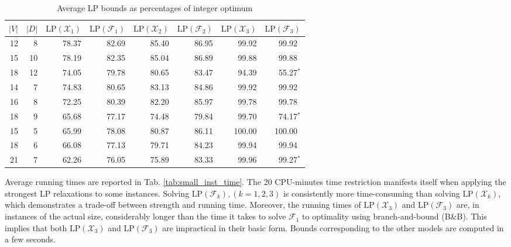 \begin{table}[h!]
\centering
\setlength{\tabcolsep}{6pt} %
\renewcommand{\arraystretch}{1.4} %
\begin{tabular}{rrrrrrrr}
$|V|$ & $|D|$ & $\text{LP}(\mathcal{X}_1)$ & $\text{LP}(\mathcal{F}_1)$ & $\text{LP}(\mathcal{X}_2)$ & $\text{LP}(\mathcal{F}_2)$ & $\text{LP}(\mathcal{X}_3)$ &$\text{LP}(\mathcal{F}_3)$\\\hline
  12 & 8       & 78.37  & 82.69  & 85.40    & 86.95    & 99.92  &  99.92\textcolor{white}{$^*$} \\
  15 & 10      & 78.19  & 82.35  & 85.04    & 86.89    & 99.88  &  99.88\textcolor{white}{$^*$} \\
  18 & 12      & 74.05  & 79.78  & 80.65    & 83.47    & 94.39  &  55.27$^*$                    \\\hline
  14 & 7       & 74.83  & 80.65  & 83.13    & 84.86    & 99.92  &  99.92\textcolor{white}{$^*$} \\
  16 & 8       & 72.25  & 80.39  & 82.20    & 85.97    & 99.78  &  99.78\textcolor{white}{$^*$} \\
  18 & 9       & 65.68  & 77.17  & 74.48    & 79.84    & 99.70  &  74.17$^*$                    \\ \hline
  15 & 5       & 65.99  & 78.08  & 80.87    & 86.11    & 100.00 & 100.00\textcolor{white}{$^*$} \\ 
  18 & 6       & 66.08  & 77.13  & 79.71    & 84.23    & 99.94  &  99.94\textcolor{white}{$^*$} \\ 
  21 & 7       & 62.26  & 76.05  & 75.89    & 83.33    & 99.96  &  99.27$^*$
\end{tabular}
\caption{Average LP bounds as percentages of integer optimum}
\label{tab:small_inst_cost}
\end{table}

Average running times are reported in Tab. \ref{tab:small_inst_time}.
The 20 CPU-minutes time restriction manifests itself when applying the strongest LP relaxations to some instances.
Solving $\text{LP}(\mathcal{F}_k), (k=1,2,3)$ is consistently more time-consuming than solving $\text{LP}(\mathcal{X}_k)$, which demonstrates a trade-off between strength and running time.  
Moreover, the running times of $\text{LP}(\mathcal{X}_3)$ and $\text{LP}(\mathcal{F}_3)$ are, in instances of the actual size, considerably longer than the time it takes to solve $\mathcal{F}_1$ to optimality using branch-and-bound (B\&B).
This implies that both $\text{LP}(\mathcal{X}_3)$ and $\text{LP}(\mathcal{F}_3)$ are impractical in their basic form.
Bounds corresponding to the other models are computed in a few seconds.

